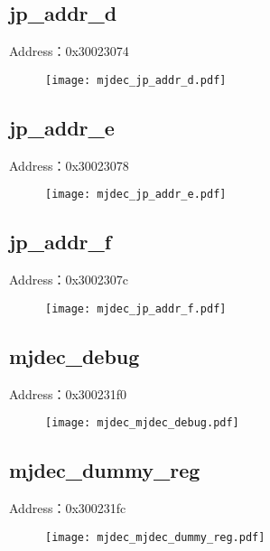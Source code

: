\subsection{jp\_addr\_d}
\label{mjdec-jp-addr-d}
Address：0x30023074
 \begin{figure}[H]
\texttt{[image: mjdec\_jp\_addr\_d.pdf]}
\end{figure}

\subsection{jp\_addr\_e}
\label{mjdec-jp-addr-e}
Address：0x30023078
 \begin{figure}[H]
\texttt{[image: mjdec\_jp\_addr\_e.pdf]}
\end{figure}

\subsection{jp\_addr\_f}
\label{mjdec-jp-addr-f}
Address：0x3002307c
 \begin{figure}[H]
\texttt{[image: mjdec\_jp\_addr\_f.pdf]}
\end{figure}

\subsection{mjdec\_debug}
\label{mjdec-mjdec-debug}
Address：0x300231f0
 \begin{figure}[H]
\texttt{[image: mjdec\_mjdec\_debug.pdf]}
\end{figure}

\subsection{mjdec\_dummy\_reg}
\label{mjdec-mjdec-dummy-reg}
Address：0x300231fc
 \begin{figure}[H]
\texttt{[image: mjdec\_mjdec\_dummy\_reg.pdf]}
\end{figure}

